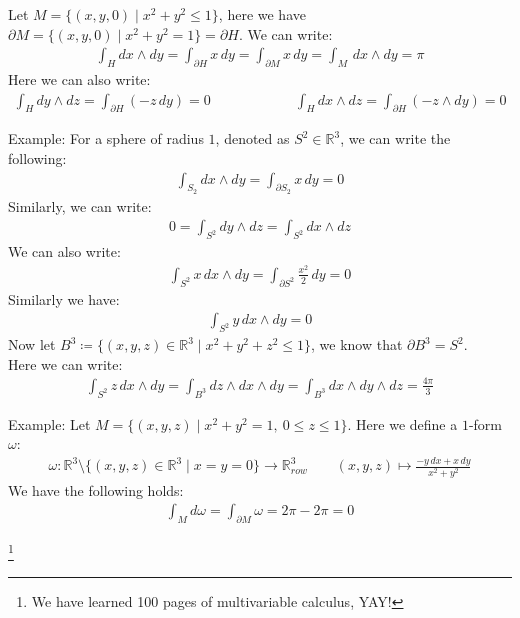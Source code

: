 \documentclass[15pt]{book}
\theoremstyle{break}
\theoremstyle{break}
\newcommand{\R}{\mathbb{R}}
\newcommand{\pd}{\partial}
\newcommand{\example}{\color{green}Example: \color{black}}
\newcommand\blfootnote[1]{%
  \begingroup
  \renewcommand\thefootnote{}\footnote{#1}%
  \addtocounter{footnote}{-1}%
  \endgroup
}
\begin{document}
Let $M = \{ (x,y,0) \mid x^2 + y^2 \leq 1\}$, here we have $\pd M = \{ (x,y,0) \mid x^2 + y^2 = 1\} = \pd H$. We can write:
\begin{align*}
 \int_{H} dx\wedge dy = \int_{\pd H} x \, dy=\int_{\pd M} x \, dy = \int_{M}\, dx \wedge dy = \pi
\end{align*}
Here we can also write:
\begin{align*}
\int_{H} dy \wedge dz = \int_{\pd H} ( -z \, dy) = 0 \qquad\qquad\qquad \int_{H}dx \wedge dz = \int_{\pd H} (-z \wedge dy) = 0
\end{align*}
\hfill\break\hfill\break



\example 
For a sphere of radius $1$, denoted as $S^2 \in \R^3$, we can write the following:
\begin{align*}
 \int_{S_2} dx \wedge dy = \int_{\pd S_2}x \, dy = 0
\end{align*}
Similarly, we can write:
\begin{align*}
0 = \int_{S^2} dy \wedge dz = \int_{S^2} dx \wedge dz
\end{align*}
We can also write:
\begin{align*}
\int_{S^2} x\, dx \wedge dy = \int_{\pd S^2} \frac{x^2}{2}\, dy = 0
\end{align*}
Similarly we have:
\begin{align*}
 \int_{S^2} y \, dx \wedge dy = 0
\end{align*}
Now let $B^3 \coloneqq \{ (x,y,z) \in \R^3 \mid x^2 + y^2 + z^2 \leq 1\}$, we know that $\pd B^3 = S^2$. \\
Here we can write:
\begin{align*}
\int_{S^2} z \, dx \wedge dy = \int_{B^3} dz \wedge dx \wedge dy = \int_{B^3} dx \wedge dy \wedge dz = \frac{4\pi }{3}
\end{align*}
\hfill\break\hfill\break

\example Let $M = \{ (x,y,z) \mid x^2 + y^2 =1 , \ 0 \leq z \leq 1\}$. Here we define a $1$-form $\omega$:
\begin{align*}
\omega:\R^3\setminus\{(x,y,z) \in \R^3 \mid x=y=0\} \to \R^3_{row} \qquad (x,y,z)\mapsto \frac{-y\, dx + x \, dy}{x^2 + y^2}
\end{align*}
We have the following holds:
\begin{align*}
 \int_{M} d\omega = \int_{\pd M} \omega = 2\pi -2 \pi =  0
\end{align*}

\blfootnote{We have learned 100 pages of multivariable calculus, YAY!}
\end{document}
